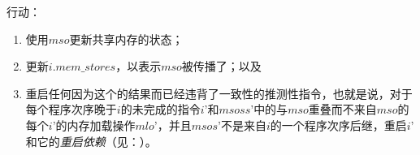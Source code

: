 行动：
\begin{enumerate}
\item 使用$mso$更新共享内存的状态；  %
\item 更新$i.\textit{mem\_stores}$，以表示$mso$被传播了；以及  %
\item 重启任何因为这个的结果而已经违背了一致性的推测性指令，也就是说，对于每个程序次序晚于$i$的未完成的指令$i’$和$msoss’$中的与$mso$重叠而不来自$mso$的每个$i’$的内存加载操作$mlo’$，并且$msos’$不是来自$i$的一个程序次序后继，重启$i’$和它的{\em 重启依赖}（见：）。  %
\end{enumerate}


